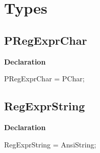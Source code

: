 \documentclass{report}
\newif\ifpdf
\begin{document}
\section{Types}
\ifpdf
\subsection*{\large{\textbf{PRegExprChar}}\normalsize\hspace{1ex}\hrulefill}
\else
\subsection*{PRegExprChar}
\fi
\label{RegExpr-PRegExprChar}
\begin{list}{}{
\setlength{\itemindent}{0cm}
\setlength{\listparindent}{0cm}
\setlength{\leftmargin}{\evensidemargin}
\addtolength{\leftmargin}{\tmplength}
\settowidth{\labelsep}{X}
\addtolength{\leftmargin}{\labelsep}
\setlength{\labelwidth}{\tmplength}
}
\item[\textbf{Declaration}\hfill]
\ifpdf
\begin{flushleft}
\fi
\begin{ttfamily}
PRegExprChar = PChar;\end{ttfamily}

\ifpdf
\end{flushleft}
\fi

\end{list}
\ifpdf
\subsection*{\large{\textbf{RegExprString}}\normalsize\hspace{1ex}\hrulefill}
\else
\subsection*{RegExprString}
\fi
\label{RegExpr-RegExprString}
\begin{list}{}{
\setlength{\itemindent}{0cm}
\setlength{\listparindent}{0cm}
\setlength{\leftmargin}{\evensidemargin}
\addtolength{\leftmargin}{\tmplength}
\settowidth{\labelsep}{X}
\addtolength{\leftmargin}{\labelsep}
\setlength{\labelwidth}{\tmplength}
}
\item[\textbf{Declaration}\hfill]
\ifpdf
\begin{flushleft}
\fi
\begin{ttfamily}
RegExprString = AnsiString;\end{ttfamily}

\ifpdf
\end{flushleft}
\fi

\end{list}
\ifpdf
\end{document}
